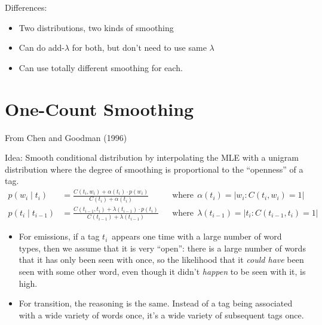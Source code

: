 \documentclass[11pt,letterpaper]{article}
\newcommand{\ngramstart}{\ensuremath{\langle \textsc{s} \rangle}}
\newcommand{\wcurr}{\ensuremath{w_i}}
\newcommand{\tcurr}{\ensuremath{t_i}}
\newcommand{\tprev}{\ensuremath{t_{i-1}}}
\begin{document}
Differences:

\begin{itemize}
  \item Two distributions, two kinds of smoothing
  \item Can do add-$\lambda$ for both, but don't need to use same $\lambda$
  \item Can use totally different smoothing for each.
\end{itemize}


\section{One-Count Smoothing}

From Chen and Goodman (1996)

Idea: Smooth conditional distribution by interpolating the MLE with a unigram distribution where the degree of smoothing is proportional to the ``openness'' of a tag.
\begin{align*}
  p(\wcurr \mid \tcurr) &= \frac{C(\tcurr,\wcurr) + \alpha(\tcurr) \cdot p(\wcurr)}{C(\tcurr) + \alpha(\tcurr)}
  &&\text{where} ~~ \alpha(\tcurr) = | \wcurr: C(\tcurr,\wcurr) = 1 | \\
  p(\tcurr \mid \tprev) &= \frac{C(\tprev,\tcurr) + \lambda(\tprev) \cdot p(\tcurr)}{C(\tprev) + \lambda(\tprev)}
  &&\text{where} ~~ \lambda(\tprev) = | \tcurr: C(\tprev,\tcurr) = 1 |
\end{align*}

\begin{itemize}
  \item For emissions, if a tag \tcurr\ appears one time with a large number of word types, then we assume that it is very ``open'': there is a large number of words that it has only been seen with once, so the likelihood that it \textit{could have} been seen with some other word, even though it didn't \textit{happen} to be seen with it, is high.
  \item For transition, the reasoning is the same.  Instead of a tag being associated with a wide variety of words once, it's a wide variety of subsequent tags once.
\end{itemize}





\newsavebox{\startaltable}
\sbox{\startaltable}{
    \begin{tabular}{l l}
      \hline
      \multicolumn{2}{|c|}{{\cellcolor{gray!40}\ngramstart}} \tabularnewline
      \hline
      \ngramstart & 1.0
    \end{tabular}
}
\end{document}
